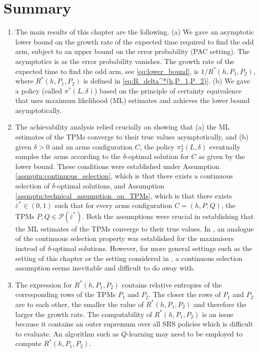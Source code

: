 \section{Summary}
\label{sec:conclusions}
\begin{enumerate}
	\item The main results of this chapter are the following. (a) We gave an asymptotic lower bound on {\color{black} the growth rate of} the expected time required to find the odd arm, subject to an upper bound on the error probability (PAC setting). The asymptotics is as the error probability vanishes. The growth rate of the expected time to find the odd arm, see \eqref{eq:lower_bound}, is $1/R^*(h,P_1, P_2)$, where $R^*(h, P_1, P_2)$ is defined in \eqref{eq:R_delta^*(h,P_1,P_2)}. (b) We gave a policy (called $\pi^*(L,\delta)$) based on the principle of certainty equivalence that uses maximum likelihood (ML) estimates and achieves the lower bound asymptotically. 
	\item The achievability analysis relied crucially on showing that (a) the ML estimates of the TPMs converge to their true values asymptotically, and (b) given $\delta>0$ and an arms configuration $C$, the policy $\pi_2^\star(L, \delta)$ eventually samples the arms according to the $\delta$-optimal solution for $C$ as given by the lower bound. These conditions were established under Assumption \ref{assmptn:continuous_selection}, which is that there exists a continuous selection of $\delta$-optimal solutions, and Assumption \ref{assmptn:technical_assumption_on_TPMs}, which is that there exists $\bar{\varepsilon}^*\in (0, 1)$ such that for every arms configuration $C=(h, P, Q)$, the TPMs $P, Q\in \mathscr{P}(\bar{\varepsilon}^*)$. Both the assumptions were crucial in establishing that the ML estimates of the TPMs converge to their true values. In \cite{vaidhiyan2017learning, prabhu2017optimal}, an analogue of the continuous selection property was established for the maximisers instead of $\delta$-optimal solutions. However, for more general settings such as the setting of this chapter or the setting considered in \cite{prabhu2020sequential}, a continuous selection assumption seems inevitable and difficult to do away with.
	\item The expression for $R^*(h, P_1, P_2)$ contains relative entropies of the corresponding rows of the TPMs $P_1$ and $P_2$. The closer the rows of $P_1$ and $P_2$ are to each other, the smaller the value of $R^*(h,P_1,P_2)$ and therefore the larger the growth rate. The computability of $R^*(h, P_1, P_2)$ is an issue because it contains an outer supremum over all SRS policies which is difficult to evaluate. An algorithm such as $Q$-learning may need to be employed to compute $R^*(h, P_1, P_2)$.

\end{enumerate}
